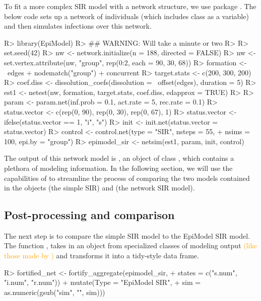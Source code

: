 \documentclass[
  shortnames]{jss}
\begin{document}
To fit a more complex SIR model with a network structure, we use package
 \citep{Jenness2018}. The below code sets up a network of
individuals (which includes class as a variable) and then simulates
infections over this network.

\begin{CodeChunk}
\begin{CodeInput}
R> library(EpiModel)
R> ## WARNING:  Will take a minute or two
R> 
R> set.seed(42)
R> nw <- network.initialize(n = 188, directed = FALSE)
R> nw <- set.vertex.attribute(nw, "group", rep(0:2, each = 90, 30, 68))
R> formation <- ~edges + nodematch("group") + concurrent
R> target.stats <- c(200, 300, 200)
R> coef.diss <- dissolution_coefs(dissolution = ~offset(edges),  duration = 5)
R> est1 <- netest(nw, formation, target.stats, coef.diss, edapprox = TRUE)
R> 
R> param <- param.net(inf.prob = 0.1, act.rate = 5, rec.rate = 0.1)
R> status.vector <- c(rep(0, 90), rep(0, 30), rep(0, 67), 1)
R> status.vector <- ifelse(status.vector == 1, "i", "s")
R> init <- init.net(status.vector = status.vector)
R> control <- control.net(type = "SIR", nsteps = 55,
+                        nsims = 100, epi.by = "group")
R> epimodel_sir <- netsim(est1, param, init, control)
\end{CodeInput}
\end{CodeChunk}

The output of this network model is , an object of
class , which contains a plethora of modeling information.
In the following section, we will use the capabilities of
 to streamline the process of comparing the two models
contained in the objects  (the simple SIR) and
 (the network SIR model).

\hypertarget{post-processing-and-comparison}{%
\subsection{Post-processing and
comparison}\label{post-processing-and-comparison}}

The next step is to compare the simple SIR model to the EpiModel SIR
model. The  function , takes
in an object from specialized classes of modeling output
\textcolor{orange}{(like those made by )} and transforms
it into a tidy-style data frame.

\begin{CodeChunk}
\begin{CodeInput}
R> fortified_net <- fortify_aggregate(epimodel_sir, 
+                                    states = c("s.num", "i.num", "r.num")) %
+   mutate(Type = "EpiModel SIR",
+          sim = as.numeric(gsub("sim", "", sim)))
\end{CodeInput}
\end{CodeChunk}
\end{document}
